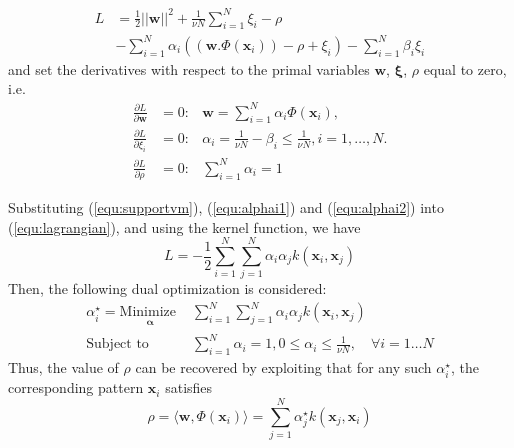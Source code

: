 \documentclass[conference]{IEEEtran}
\begin{document}
\begin{align}
\label{equ:lagrangian}
L &=\frac{1}{2}\left|\left| \mathbf{w}\right|\right|^2 + \frac{1}{\nu N}\sum_{i=1}^N\xi_i - \rho \nonumber \\
&-\sum_{i=1}^N\alpha_i((\mathbf{w}.\Phi(\mathbf{x}_i))-\rho +\xi_i)-\sum_{i=1}^N\beta_i\xi_i
\end{align}
and set the derivatives with respect to the primal variables $\mathbf{w}$, $\boldsymbol{\xi}$, $\rho$ equal to zero, i.e.
\begin{eqnarray}
\label{equ:supportvm}
\frac{\partial L}{\partial \mathbf{w}} & = 0: & \mathbf{w}=\sum_{i=1}^N\alpha_i\Phi(\mathbf{x}_i),\\%
\label{equ:alphai1}
\frac{\partial L}{\partial \xi_i}  & =0: & \alpha_i=\frac{1}{\nu N}-\beta_i \leq \frac{1}{\nu N},  i=1,\ldots,N. \\
\label{equ:alphai2}
\frac{\partial L}{\partial \rho} & = 0: & \sum_{i=1}^N\alpha_i=1
\end{eqnarray}

Substituting (\ref{equ:supportvm}), (\ref{equ:alphai1}) and (\ref{equ:alphai2}) into (\ref{equ:lagrangian}), and using the kernel function, we have 
\begin{equation}
\label{equ:lagrangianalpha}
L=-\frac{1}{2}\sum_{i=1}^N\sum_{j=1}^N \alpha_i\alpha_j k(\mathbf{x}_i, \mathbf{x}_j)
\end{equation}
Then, the following dual optimization is considered:
\begin{subequations}\label{euq:ocsvmker}
\begin{align}
\alpha_i^\star = \underset{
	\begin{array}{c}
		 \mathbf{\alpha}
	\end{array}}{\text{Minimize }} & \sum_{i=1}^N\sum_{j=1}^N \alpha_i\alpha_j k(\mathbf{x}_i, \mathbf{x}_j)\\
\text{Subject to } & \sum_{i=1}^N\alpha_i=1 ,  0\leq \alpha_i\leq \frac{1}{\nu N}, \quad \forall i=1\ldots N
\end{align}
\end{subequations}
Thus, the value of $\rho$
can be recovered by exploiting that for any such $\alpha_i^\star$, the corresponding pattern $ \mathbf{x}_i$ satisfies
\begin{equation}
\label{equ:rho}
\rho=\langle\mathbf{w},\Phi(\mathbf{x}_i)\rangle=\sum_{j=1}^N\alpha_j^\star k(\mathbf{x}_j, \mathbf{x}_i)
\end{equation}
\end{document}
